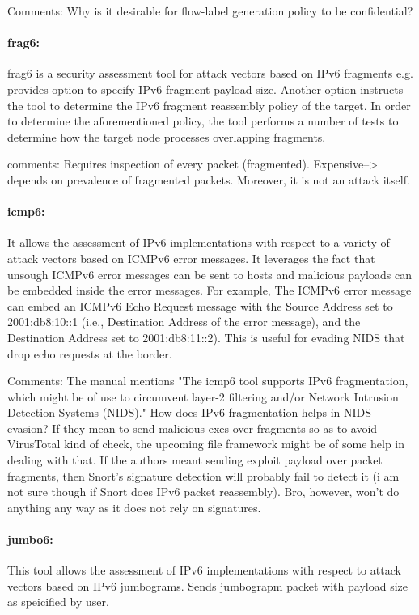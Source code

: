 \documentclass{article}
\begin{document}
Comments: Why is it desirable for flow-label generation policy to be confidential? 

\paragraph*{frag6:} frag6 is a security assessment tool for attack vectors based on IPv6 fragments e.g. provides option to specify IPv6 fragment payload size. Another option instructs the tool to determine the IPv6 fragment reassembly policy of the target. In
order to determine the aforementioned policy, the tool performs a number of tests to determine how
the target node processes overlapping fragments.

comments: Requires inspection of every packet (fragmented). Expensive--> depends on prevalence of fragmented packets. Moreover, it is not an attack itself.

\paragraph*{icmp6:} It allows the assessment of IPv6 implementations with respect to a variety of attack vectors based on ICMPv6 error messages. It leverages the fact that unsough ICMPv6 error messages can be sent to hosts and malicious payloads can be embedded inside the error messages. For example, The ICMPv6 error message can embed an ICMPv6 Echo Request message with the Source Address set to 2001:db8:10::1 (i.e., Destination Address of the error message), and
the Destination Address set to 2001:db8:11::2). This is useful for evading NIDS that drop echo requests at the border.

Comments: The manual mentions "The icmp6 tool supports IPv6 fragmentation, which might be of use to circumvent layer-2 filtering
and/or Network Intrusion Detection Systems (NIDS)." How does IPv6 fragmentation helps in NIDS evasion? If they mean to send malicious exes over fragments so as to avoid VirusTotal kind of check, the upcoming file framework might be of some help in dealing with that. If the authors meant sending exploit payload over packet fragments, then Snort's signature detection will probably fail to detect it (i am not sure though if Snort does IPv6 packet reassembly). Bro, however, won't do anything any way as it does not rely on signatures. 

\paragraph*{jumbo6:} This tool allows the assessment of IPv6 implementations with respect to attack vectors based on IPv6 jumbograms. Sends jumbograpm packet with payload size as speicified by user.
\end{document}
